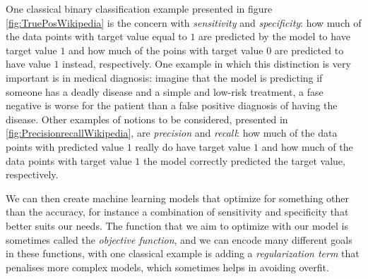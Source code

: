 One classical binary classification example presented in figure \ref{fig:TruePosWikipedia} is the concern with \emph{sensitivity} and \emph{specificity}: how much of the data points with target value equal to $1$ are predicted by the model to have target value $1$ and how much of the poins with target value $0$ are predicted to have value $1$ instead, respectively. One example in which this distinction is very important is in medical diagnosis: imagine that the model is predicting if someone has a deadly disease and a simple and low-risk treatment, a fase negative is worse for the patient than a false positive diagnosis of having the disease. Other examples of notions to be considered, presented in \ref{fig:PrecisionrecallWikipedia}, are \emph{precision} and \emph{recall}: how much of the data points with predicted value $1$ really do have target value $1$ and how much of the data points with target value $1$ the model correctly predicted the target value, respectively. 

We can then create machine learning models that optimize for something other than the accuracy, for instance a combination of sensitivity and specificity that better suits our needs. The function that we aim to optimize with our model is sometimes called the \emph{objective function}, and we can encode many different goals in these functions, with one classical example is adding a \emph{regularization term} that penalises more complex models, which sometimes helps in avoiding overfit.

